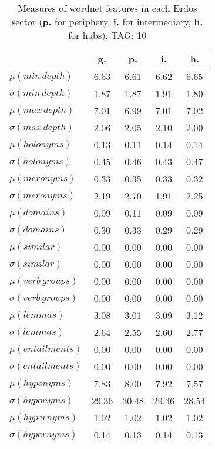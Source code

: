 \begin{table}[h!]
\begin{center}
\begin{tabular}{| l || c | c | c | c |}\hline
 & {\bf g.} & {\bf p.} & {\bf i.} & {\bf h.} \\\hline\hline
$\mu(min\,depth)$ & 6.63  & 6.61  & 6.62  & 6.65 \\
$\sigma(min\,depth)$ & 1.87  & 1.87  & 1.91  & 1.80 \\\hline
$\mu(max\,depth)$ & 7.01  & 6.99  & 7.01  & 7.02 \\
$\sigma(max\,depth)$ & 2.06  & 2.05  & 2.10  & 2.00 \\\hline
$\mu(holonyms)$ & 0.13  & 0.11  & 0.14  & 0.14 \\
$\sigma(holonyms)$ & 0.45  & 0.46  & 0.43  & 0.47 \\\hline
$\mu(meronyms)$ & 0.33  & 0.35  & 0.33  & 0.32 \\
$\sigma(meronyms)$ & 2.19  & 2.70  & 1.91  & 2.25 \\\hline
$\mu(domains)$ & 0.09  & 0.11  & 0.09  & 0.09 \\
$\sigma(domains)$ & 0.30  & 0.33  & 0.29  & 0.29 \\\hline
$\mu(similar)$ & 0.00  & 0.00  & 0.00  & 0.00 \\
$\sigma(similar)$ & 0.00  & 0.00  & 0.00  & 0.00 \\\hline
$\mu(verb\,groups)$ & 0.00  & 0.00  & 0.00  & 0.00 \\
$\sigma(verb\,groups)$ & 0.00  & 0.00  & 0.00  & 0.00 \\\hline
$\mu(lemmas)$ & 3.08  & 3.01  & 3.09  & 3.12 \\
$\sigma(lemmas)$ & 2.64  & 2.55  & 2.60  & 2.77 \\\hline
$\mu(entailments)$ & 0.00  & 0.00  & 0.00  & 0.00 \\
$\sigma(entailments)$ & 0.00  & 0.00  & 0.00  & 0.00 \\\hline
$\mu(hyponyms)$ & 7.83  & 8.00  & 7.92  & 7.57 \\
$\sigma(hyponyms)$ & 29.36  & 30.48  & 29.36  & 28.54 \\\hline
$\mu(hypernyms)$ & 1.02  & 1.02  & 1.02  & 1.02 \\
$\sigma(hypernyms)$ & 0.14  & 0.13  & 0.14  & 0.13 \\\hline
\end{tabular}
\caption{Measures of wordnet features in each Erd\"os sector ({{\bf p.}} for periphery, {{\bf i.}} for intermediary, {{\bf h.}} for hubs). TAG: 10}
\end{center}
\end{table}